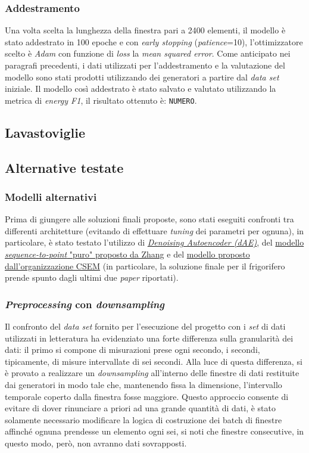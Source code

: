 \documentclass[12pt,a4paper,fleqn]{article}
\begin{document}
\subsubsection{Addestramento}
Una volta scelta la lunghezza della finestra pari a 2400 elementi, il modello è stato addestrato in 100 epoche e con \textsl{early stopping} (\textsl{patience}=10), l'ottimizzatore scelto è \textsl{Adam} con funzione di \textsl{loss} la \textsl{mean squared error}. Come anticipato nei paragrafi precedenti, i dati utilizzati per l'addestramento e la valutazione del modello sono stati prodotti utilizzando dei generatori a partire dal \textsl{data set} iniziale.
Il modello così addestrato è stato salvato e valutato utilizzando la metrica di \textsl{energy F1}, il risultato ottenuto è: \texttt{NUMERO}.

\subsection{Lavastoviglie}

\subsection{Alternative testate}

\subsubsection{Modelli alternativi}
Prima di giungere alle soluzioni finali proposte, sono stati eseguiti confronti tra differenti architetture (evitando di effettuare \textsl{tuning} dei parametri per ognuna), in particolare, è stato testato l'utilizzo di \href{https://arxiv.org/abs/1507.06594}{\textsl{Denoising Autoencoder (dAE)}}, del \href{https://arxiv.org/abs/1612.09106}{modello \textsl{sequence-to-point} "puro" proposto da Zhang} e del \href{http://nilmworkshop.org/2018/proceedings/Poster_ID20.pdf}{modello proposto dall'organizzazione CSEM} (in particolare, la soluzione finale per il frigorifero prende spunto dagli ultimi due \textsl{paper} riportati).

\subsubsection{\textsl{Preprocessing} con \textsl{downsampling}}
Il confronto del \textsl{data set} fornito per l'esecuzione del progetto con i \textsl{set} di dati utilizzati in letteratura ha evidenziato una forte differenza sulla granularità dei dati: il primo si compone di misurazioni prese ogni secondo, i secondi, tipicamente, di misure intervallate di sei secondi. Alla luce di questa differenza, si è provato a realizzare un \textsl{downsampling} all'interno delle finestre di dati restituite dai generatori in modo tale che, mantenendo fissa la dimensione, l'intervallo temporale coperto dalla finestra fosse maggiore. Questo approccio consente di evitare di dover rinunciare a priori ad una grande quantità di dati, è stato solamente necessario modificare la logica di costruzione dei batch di finestre affinché ognuna prendesse un elemento ogni sei, si noti che finestre consecutive, in questo modo, però, non avranno dati sovrapposti.
\end{document}
